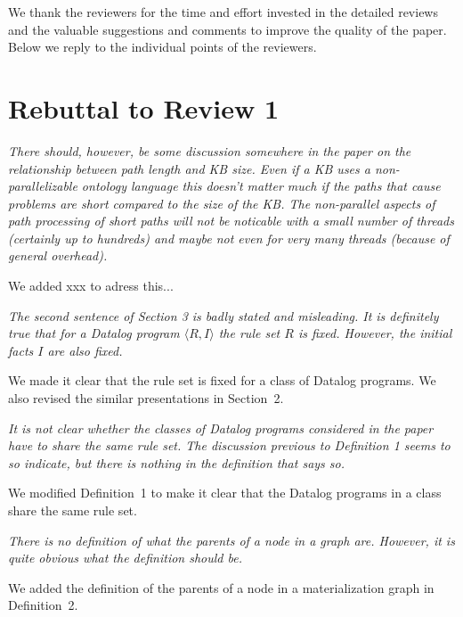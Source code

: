 \documentclass{article}
\let\quoteOld\quote
\let\endquoteOld\endquote
\renewenvironment{quote}{\quoteOld\itshape}{\endquoteOld}
\begin{document}
We thank the reviewers for the time and effort invested in the detailed reviews and the valuable suggestions and comments to improve the quality of the paper.  Below we reply to the individual points of the reviewers.


\section{Rebuttal to Review 1}

\begin{quote}
There should, however, be some discussion somewhere in the paper on the
relationship between path length and KB size.   Even if a KB uses a
non-parallelizable ontology language this doesn't matter much if the paths
that cause problems are short compared to the size of the KB.  The
non-parallel aspects of path processing of short paths will not be noticable
with a small number of threads (certainly up to hundreds) and maybe not even
for very many threads (because of general overhead).
\end{quote}

We added xxx to adress this...

\begin{quote}
  The second sentence of Section 3 is badly stated and misleading.  It is definitely true that for a Datalog program $\langle R, I \rangle$ the rule set $R$ is fixed.  However, the initial facts $I$ are also fixed.
\end{quote}

We made it clear that the rule set is fixed for a class of Datalog programs.
We also revised the similar presentations in Section~2.

\begin{quote}
It is not clear whether the classes of Datalog programs considered in the
paper have to share the same rule set.  The discussion previous to
Definition 1 seems to so indicate, but there is nothing in the definition
that says so.
\end{quote}

We modified Definition~1 to make it clear that the Datalog programs
in a class share the same rule set.

\begin{quote}
There is no definition of what the parents of a node in a graph are.
However, it is quite obvious what the definition should be.
\end{quote}

We added the definition of the parents of a node in a materialization graph in Definition~2.
\end{document}
